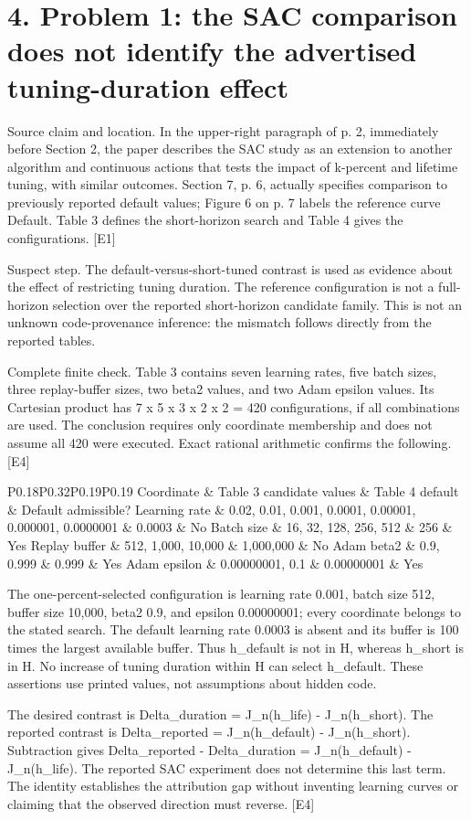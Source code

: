 \documentclass[10pt]{article}
\begin{document}
\section*{4. Problem 1: the SAC comparison does not identify the advertised tuning-duration effect}
Source claim and location. In the upper-right paragraph of p. 2, immediately before Section 2, the paper describes the SAC study as an extension to another algorithm and continuous actions that tests the impact of k-percent and lifetime tuning, with similar outcomes. Section 7, p. 6, actually specifies comparison to previously reported default values; Figure 6 on p. 7 labels the reference curve Default. Table 3 defines the short-horizon search and Table 4 gives the configurations. [E1]\par
Suspect step. The default-versus-short-tuned contrast is used as evidence about the effect of restricting tuning duration. The reference configuration is not a full-horizon selection over the reported short-horizon candidate family. This is not an unknown code-provenance inference: the mismatch follows directly from the reported tables.\par
Complete finite check. Table 3 contains seven learning rates, five batch sizes, three replay-buffer sizes, two beta2 values, and two Adam epsilon values. Its Cartesian product has 7 x 5 x 3 x 2 x 2 = 420 configurations, if all combinations are used. The conclusion requires only coordinate membership and does not assume all 420 were executed. Exact rational arithmetic confirms the following. [E4]\par
P0.18P0.32P0.19P0.19 Coordinate \& Table 3 candidate values \& Table 4 default \& Default admissible?
Learning rate \& 0.02, 0.01, 0.001, 0.0001, 0.00001, 0.000001, 0.0000001 \& 0.0003 \& No
Batch size \& 16, 32, 128, 256, 512 \& 256 \& Yes
Replay buffer \& 512, 1,000, 10,000 \& 1,000,000 \& No
Adam beta2 \& 0.9, 0.999 \& 0.999 \& Yes
Adam epsilon \& 0.00000001, 0.1 \& 0.00000001 \& Yes\par
The one-percent-selected configuration is learning rate 0.001, batch size 512, buffer size 10,000, beta2 0.9, and epsilon 0.00000001; every coordinate belongs to the stated search. The default learning rate 0.0003 is absent and its buffer is 100 times the largest available buffer. Thus h\_default is not in H, whereas h\_short is in H. No increase of tuning duration within H can select h\_default. These assertions use printed values, not assumptions about hidden code.\par
The desired contrast is Delta\_duration = J\_n(h\_life) - J\_n(h\_short). The reported contrast is Delta\_reported = J\_n(h\_default) - J\_n(h\_short). Subtraction gives Delta\_reported - Delta\_duration = J\_n(h\_default) - J\_n(h\_life). The reported SAC experiment does not determine this last term. The identity establishes the attribution gap without inventing learning curves or claiming that the observed direction must reverse. [E4]\par
\end{document}
